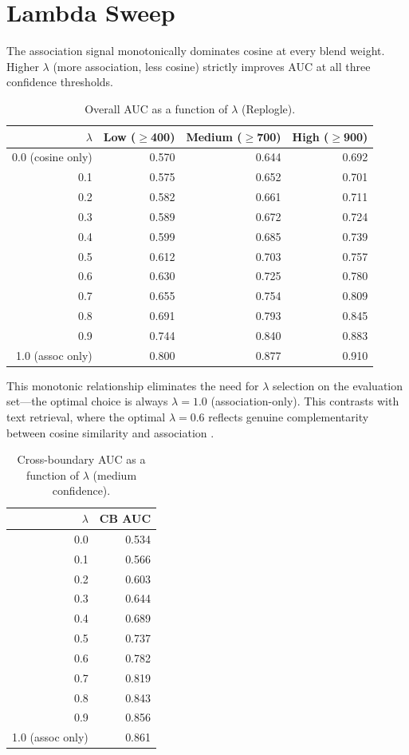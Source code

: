 \documentclass[11pt]{article}
\begin{document}
\appendix

\section{Lambda Sweep}
\label{app:lambda}

The association signal monotonically dominates cosine at every blend weight. Higher $\lambda$ (more association, less cosine) strictly improves AUC at all three confidence thresholds.

\begin{table}[h]
\centering
\caption{Overall AUC as a function of $\lambda$ (Replogle).}
\label{tab:lambda}
\begin{tabular}{rrrr}
\toprule
$\lambda$ & Low ($\geq$400) & Medium ($\geq$700) & High ($\geq$900) \\
\midrule
0.0 (cosine only) & 0.570 & 0.644 & 0.692 \\
0.1 & 0.575 & 0.652 & 0.701 \\
0.2 & 0.582 & 0.661 & 0.711 \\
0.3 & 0.589 & 0.672 & 0.724 \\
0.4 & 0.599 & 0.685 & 0.739 \\
0.5 & 0.612 & 0.703 & 0.757 \\
0.6 & 0.630 & 0.725 & 0.780 \\
0.7 & 0.655 & 0.754 & 0.809 \\
0.8 & 0.691 & 0.793 & 0.845 \\
0.9 & 0.744 & 0.840 & 0.883 \\
1.0 (assoc only) & 0.800 & 0.877 & 0.910 \\
\bottomrule
\end{tabular}
\end{table}

This monotonic relationship eliminates the need for $\lambda$ selection on the evaluation set---the optimal choice is always $\lambda = 1.0$ (association-only). This contrasts with text retrieval, where the optimal $\lambda = 0.6$ reflects genuine complementarity between cosine similarity and association \citep{dury2026aar}.

\begin{table}[h]
\centering
\caption{Cross-boundary AUC as a function of $\lambda$ (medium confidence).}
\label{tab:lambda_cb}
\begin{tabular}{rr}
\toprule
$\lambda$ & CB AUC \\
\midrule
0.0 & 0.534 \\
0.1 & 0.566 \\
0.2 & 0.603 \\
0.3 & 0.644 \\
0.4 & 0.689 \\
0.5 & 0.737 \\
0.6 & 0.782 \\
0.7 & 0.819 \\
0.8 & 0.843 \\
0.9 & 0.856 \\
1.0 (assoc only) & 0.861 \\
\bottomrule
\end{tabular}
\end{table}
\end{document}
